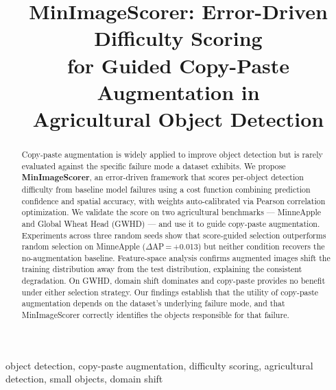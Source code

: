 \documentclass[conference]{IEEEtran}
\begin{document}
\title{MinImageScorer: Error-Driven Difficulty Scoring\\
for Guided Copy-Paste Augmentation in\\
Agricultural Object Detection}

\author{
}

\maketitle

\begin{abstract}
Copy-paste augmentation is widely applied to improve
object detection but is rarely evaluated against the
specific failure mode a dataset exhibits. We propose
\textbf{MinImageScorer}, an error-driven framework that
scores per-object detection difficulty from baseline model
failures using a cost function combining prediction
confidence and spatial accuracy, with weights
auto-calibrated via Pearson correlation optimization.
We validate the score on two agricultural benchmarks ---
MinneApple and Global Wheat Head (GWHD) --- and use it to
guide copy-paste augmentation. Experiments across three
random seeds show that score-guided selection outperforms
random selection on MinneApple ($\Delta$AP\,=\,+0.013)
but neither condition recovers the no-augmentation
baseline. Feature-space analysis confirms augmented images
shift the training distribution away from the test
distribution, explaining the consistent degradation.
On GWHD, domain shift dominates and copy-paste provides
no benefit under either selection strategy. Our findings
establish that the utility of copy-paste augmentation
depends on the dataset's underlying failure mode, and
that MinImageScorer correctly identifies the objects
responsible for that failure.
\end{abstract}

\begin{IEEEkeywords}
object detection, copy-paste augmentation, difficulty
scoring, agricultural detection, small objects,
domain shift
\end{IEEEkeywords}

\end{document}
